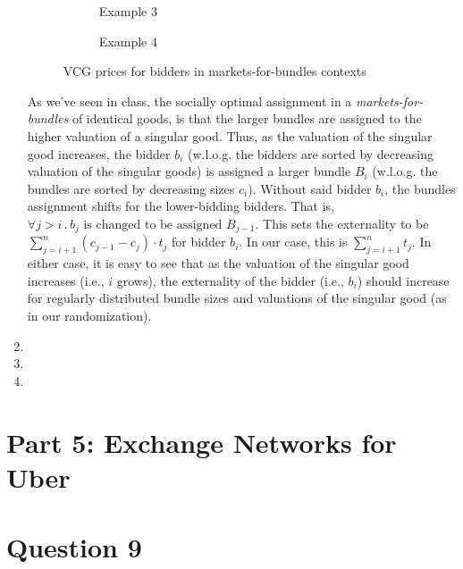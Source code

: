\documentclass{article}
\begin{document}
\begin{enumerate}[label=(\alph*)]
\begin{figure*}[ht]
        \begin{subfigure}{0.49\textwidth}
            \centering
            \resizebox{\textwidth}{!}{}
            \caption{Example 3}
        \end{subfigure}
        \hfill
        \begin{subfigure}{0.49\textwidth}
            \centering
            \resizebox{\textwidth}{!}{}
            \caption{Example 4}
        \end{subfigure}
        
        \caption{VCG prices for bidders in markets-for-bundles contexts}
        \label{fig:b2a}
    \end{figure*}
    
    As we've seen in class, the socially optimal assignment in a \textit{markets-for-bundles} of identical goods, is that the larger bundles are assigned to the higher valuation of a singular good. Thus, as the valuation of the singular good increases, the bidder $b_i$ (w.l.o.g. the bidders are sorted by decreasing valuation of the singular goods) is assigned a larger bundle $B_i$ (w.l.o.g. the bundles are sorted by decreasing sizes $c_i$). Without said bidder $b_i$, the bundles assignment shifts for the lower-bidding bidders. That is, $\forall j > i \, . \, b_j \text{ is changed to be assigned } B_{j-1}$. This sets the externality to be $\sum_{j=i+1}^{n} (c_{j-1} - c_j) \cdot t_j$ for bidder $b_i$. In our case, this is $\sum_{j=i+1}^{n} t_j$. In either case, it is easy to see that as the valuation of the singular good increases (i.e., $i$ grows), the externality of the bidder (i.e., $b_i$) should increase for regularly distributed bundle sizes and valuations of the singular good (as in our randomization).

    \item 


    \item 

    
    \item 


\end{enumerate}

\section*{Part 5: Exchange Networks for Uber}
\setcounter{section}{0}


\section{Question 9}
\end{document}
